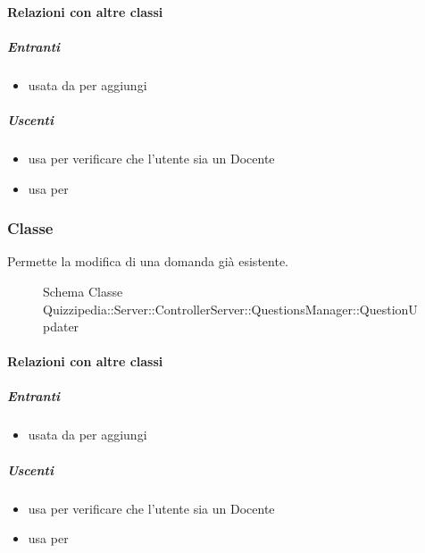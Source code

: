 \paragraph{Relazioni con altre classi}
\subparagraph{Entranti}
\begin{itemize}
\item usata da  per aggiungi
\end{itemize}
\subparagraph{Uscenti}
\begin{itemize}
\item usa  per verificare che l'utente sia un Docente
\item usa  per 
\end{itemize}
\subsubsection{Classe }
Permette la modifica di una domanda già esistente.
\begin{figure}[H]
\centering
\noindent{}
\caption[Schema Classe QuestionUpdater]{Schema Classe Quizzipedia::Server::ControllerServer::QuestionsManager::QuestionUpdater}
\end{figure}
\paragraph{Relazioni con altre classi}
\subparagraph{Entranti}
\begin{itemize}
\item usata da  per aggiungi
\end{itemize}
\subparagraph{Uscenti}
\begin{itemize}
\item usa  per verificare che l'utente sia un Docente
\item usa  per 
\end{itemize}

